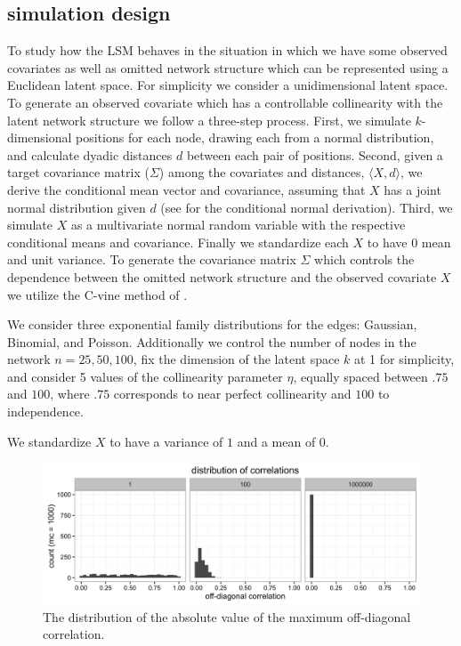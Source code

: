 \documentclass[12pt]{article}
\begin{document}
\subsection{simulation design}

To study how the LSM behaves in the situation in which we have some observed covariates as well as omitted network structure which can be represented using a Euclidean latent space. For simplicity we consider a unidimensional latent space. To generate an observed covariate which has a controllable collinearity with the latent network structure we follow a three-step process. First, we simulate $k$-dimensional positions for each node, drawing each from a normal distribution, and calculate dyadic distances $d$ between each pair of positions. Second, given a target covariance matrix ($\Sigma$) among the covariates and distances, $\langle X,d \rangle$, we derive the conditional mean vector and covariance, assuming that $X$ has a joint normal distribution given $d$ (see \cite[pp. 116--117]{eaton1983} for the conditional normal derivation). Third, we simulate $X$ as a multivariate normal random variable with the respective conditional means and covariance. Finally we standardize each $X$ to have 0 mean and unit variance. To generate the covariance matrix $\Sigma$ which controls the dependence between the omitted network structure and the observed covariate $X$ we utilize the C-vine method of \cite{lewandowski2009generating}. %

We consider three exponential family distributions for the edges: Gaussian, Binomial, and Poisson. Additionally we control the number of nodes in the network $n = 25, 50, 100$, fix the dimension of the latent space $k$ at 1 for simplicity, and consider 5 values of the collinearity parameter $\eta$, equally spaced between $.75$ and $100$, where $.75$ corresponds to near perfect collinearity and $100$ to independence.

We standardize $X$ to have a variance of $1$ and a mean of $0$.

\begin{figure}
\includegraphics[width=\textwidth]{max_r_vine.png}
\caption{The distribution of the absolute value of the maximum off-diagonal correlation.}
\end{figure}
\end{document}
